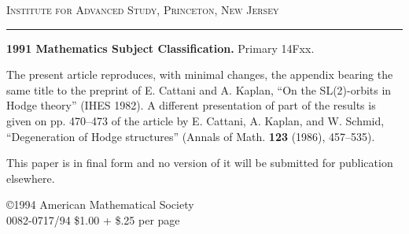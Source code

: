 \documentclass[12pt,a4paper]{article}
\theoremstyle{plain}
\theoremstyle{definition}
\begin{document}
\vspace{1cm}

\begin{flushright}
\textsc{Institute for Advanced Study, Princeton, New Jersey}
\end{flushright}

\vfill

\begin{center}
\rule{0.5\textwidth}{0.4pt}
\end{center}

\vspace{0.3cm}

{\small\noindent\textbf{1991 Mathematics Subject Classification.} Primary 14Fxx.}

\vspace{0.2cm}

{\small\noindent The present article reproduces, with minimal changes, the appendix bearing the same title to the preprint of E. Cattani and A. Kaplan, ``On the SL(2)-orbits in Hodge theory'' (IHES 1982). A different presentation of part of the results is given on pp. 470--473 of the article by E. Cattani, A. Kaplan, and W. Schmid, ``Degeneration of Hodge structures'' (Annals of Math. \textbf{123} (1986), 457--535).}

\vspace{0.2cm}

{\small\noindent This paper is in final form and no version of it will be submitted for publication elsewhere.}

\vspace{0.2cm}

{\small\noindent \copyright 1994 American Mathematical Society\\
0082-0717/94 \$1.00 + \$.25 per page}
\end{document}
